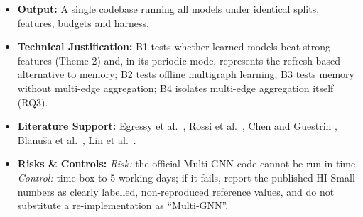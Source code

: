 \documentclass[11pt,a4paper]{article}
\begin{document}
\begin{itemize}[leftmargin=*]
\begin{enumerate}[leftmargin=*]
    \end{enumerate}
    \item \textbf{Output:} A single codebase running all models under identical splits, features, budgets and harness.
    \item \textbf{Technical Justification:} B1 tests whether learned models beat strong features (Theme 2) and, in its periodic mode, represents the refresh-based alternative to memory; B2 tests offline multigraph learning; B3 tests memory without multi-edge aggregation; B4 isolates multi-edge aggregation itself (RQ3).
    \item \textbf{Literature Support:} Egressy et al.\ \cite{egressy2024multigraph}, Rossi et al.\ \cite{rossi2020tgn}, Chen and Guestrin \cite{chen2016xgboost}, Blanu\v{s}a et al.\ \cite{blanusa2024gfp}, Lin et al.\ \cite{lin2024fraudgt}.
    \item \textbf{Risks \& Controls:} \textit{Risk:} the official Multi-GNN code cannot be run in time. \textit{Control:} time-box to 5 working days; if it fails, report the published HI-Small numbers as clearly labelled, non-reproduced reference values, and do not substitute a re-implementation as ``Multi-GNN''.
\end{itemize}

\end{document}
